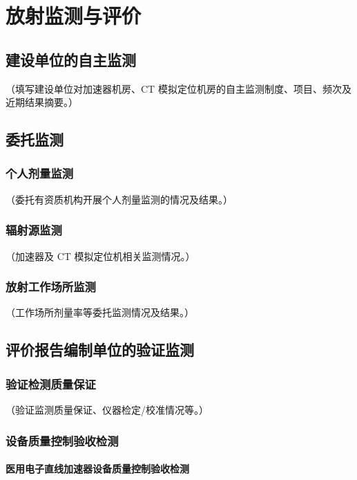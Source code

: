 \chapter{放射监测与评价}

\section{建设单位的自主监测}

（填写建设单位对加速器机房、CT 模拟定位机房的自主监测制度、项目、频次及近期结果摘要。）

\section{委托监测}

\subsection{个人剂量监测}

（委托有资质机构开展个人剂量监测的情况及结果。）

\subsection{辐射源监测}

（加速器及 CT 模拟定位机相关监测情况。）

\subsection{放射工作场所监测}

（工作场所剂量率等委托监测情况及结果。）

\section{评价报告编制单位的验证监测}

\subsection{验证检测质量保证}

（验证监测质量保证、仪器检定/校准情况等。）

\subsection{设备质量控制验收检测}

\subsubsection{医用电子直线加速器设备质量控制验收检测}

